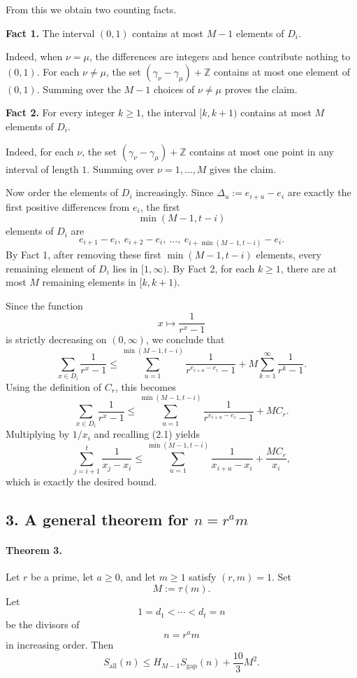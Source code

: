 From this we obtain two counting facts.

\medskip

\noindent\textbf{Fact 1.} The interval \((0,1)\) contains at most \(M-1\) elements of \(D_i\).

Indeed, when \(\nu=\mu\), the differences are integers and hence contribute nothing to \((0,1)\). For each \(\nu\neq \mu\), the set \((\gamma_\nu-\gamma_\mu)+\mathbb Z\) contains at most one element of \((0,1)\). Summing over the \(M-1\) choices of \(\nu\neq \mu\) proves the claim.

\medskip

\noindent\textbf{Fact 2.} For every integer \(k\geq 1\), the interval \([k,k+1)\) contains at most \(M\) elements of \(D_i\).

Indeed, for each \(\nu\), the set \((\gamma_\nu-\gamma_\mu)+\mathbb Z\) contains at most one point in any interval of length \(1\). Summing over \(\nu=1,\dots,M\) gives the claim.

\medskip

Now order the elements of \(D_i\) increasingly. Since \(\Delta_u:=e_{i+u}-e_i\) are exactly the first positive differences from \(e_i\), the first
\[
\min(M-1,t-i)
\]
elements of \(D_i\) are
\[
e_{i+1}-e_i,\ e_{i+2}-e_i,\ \dots,\ e_{i+\min(M-1,t-i)}-e_i.
\]
By Fact 1, after removing these first \(\min(M-1,t-i)\) elements, every remaining element of \(D_i\) lies in \([1,\infty)\). By Fact 2, for each \(k\geq 1\), there are at most \(M\) remaining elements in \([k,k+1)\).

Since the function
\[
x\mapsto \frac{1}{r^x-1}
\]
is strictly decreasing on \((0,\infty)\), we conclude that
\[
\sum_{x\in D_i}\frac{1}{r^x-1}
\leq
\sum_{u=1}^{\min(M-1,t-i)}\frac{1}{r^{e_{i+u}-e_i}-1}
+
M\sum_{k=1}^{\infty}\frac{1}{r^k-1}.
\]
Using the definition of \(C_r\), this becomes
\[
\sum_{x\in D_i}\frac{1}{r^x-1}
\leq
\sum_{u=1}^{\min(M-1,t-i)}\frac{1}{r^{e_{i+u}-e_i}-1}
+
M C_r.
\]
Multiplying by \(1/x_i\) and recalling (2.1) yields
\[
\sum_{j=i+1}^{t}\frac{1}{x_j-x_i}
\leq
\sum_{u=1}^{\min(M-1,t-i)}\frac{1}{x_{i+u}-x_i}
+
\frac{M C_r}{x_i},
\]
which is exactly the desired bound.

\subsection*{3. A general theorem for \(n=r^a m\)}

\paragraph{Theorem 3.}
Let \(r\) be a prime, let \(a\geq 0\), and let \(m\geq 1\) satisfy \((r,m)=1\). Set
\[
M:=\tau(m).
\]
Let
\[
1=d_1<\cdots<d_t=n
\]
be the divisors of
\[
n=r^a m
\]
in increasing order. Then
\[
S_{\mathrm{all}}(n)\leq H_{M-1}S_{\mathrm{gap}}(n)+\frac{10}{3}M^2.
\]

